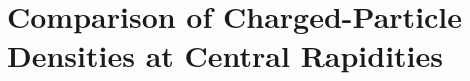 \section{Comparison of Charged-Particle Densities at Central Rapidities}\label{chapter:discussion}


